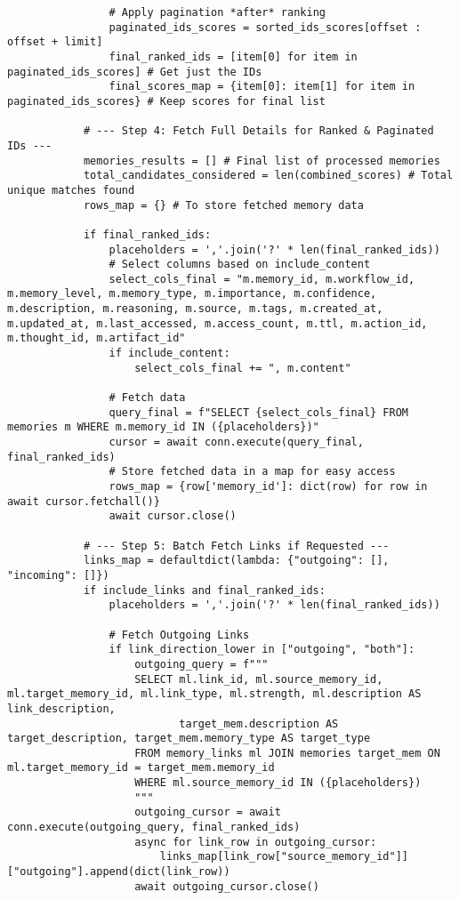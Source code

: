 \documentclass[12pt,a4paper]{article}
\begin{document}
\begin{pageablecode}
\begin{verbatim}
                # Apply pagination *after* ranking
                paginated_ids_scores = sorted_ids_scores[offset : offset + limit]
                final_ranked_ids = [item[0] for item in paginated_ids_scores] # Get just the IDs
                final_scores_map = {item[0]: item[1] for item in paginated_ids_scores} # Keep scores for final list

            # --- Step 4: Fetch Full Details for Ranked & Paginated IDs ---
            memories_results = [] # Final list of processed memories
            total_candidates_considered = len(combined_scores) # Total unique matches found
            rows_map = {} # To store fetched memory data

            if final_ranked_ids:
                placeholders = ','.join('?' * len(final_ranked_ids))
                # Select columns based on include_content
                select_cols_final = "m.memory_id, m.workflow_id, m.memory_level, m.memory_type, m.importance, m.confidence, m.description, m.reasoning, m.source, m.tags, m.created_at, m.updated_at, m.last_accessed, m.access_count, m.ttl, m.action_id, m.thought_id, m.artifact_id"
                if include_content:
                    select_cols_final += ", m.content"

                # Fetch data
                query_final = f"SELECT {select_cols_final} FROM memories m WHERE m.memory_id IN ({placeholders})"
                cursor = await conn.execute(query_final, final_ranked_ids)
                # Store fetched data in a map for easy access
                rows_map = {row['memory_id']: dict(row) for row in await cursor.fetchall()}
                await cursor.close()

            # --- Step 5: Batch Fetch Links if Requested ---
            links_map = defaultdict(lambda: {"outgoing": [], "incoming": []})
            if include_links and final_ranked_ids:
                placeholders = ','.join('?' * len(final_ranked_ids))

                # Fetch Outgoing Links
                if link_direction_lower in ["outgoing", "both"]:
                    outgoing_query = f"""
                    SELECT ml.link_id, ml.source_memory_id, ml.target_memory_id, ml.link_type, ml.strength, ml.description AS link_description,
                           target_mem.description AS target_description, target_mem.memory_type AS target_type
                    FROM memory_links ml JOIN memories target_mem ON ml.target_memory_id = target_mem.memory_id
                    WHERE ml.source_memory_id IN ({placeholders})
                    """
                    outgoing_cursor = await conn.execute(outgoing_query, final_ranked_ids)
                    async for link_row in outgoing_cursor:
                        links_map[link_row["source_memory_id"]]["outgoing"].append(dict(link_row))
                    await outgoing_cursor.close()


\end{verbatim}
\end{pageablecode}
\end{document}
